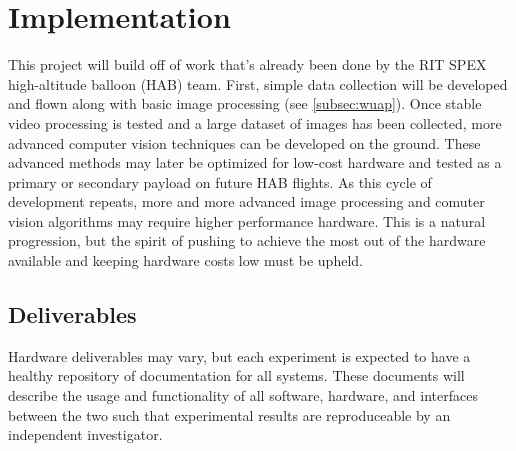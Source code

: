 \documentclass[conference]{IEEEtran} %
\begin{document}
\section{Implementation}
\label{sec:implementation}
This project will build off of work that's already been done by the RIT SPEX high-altitude balloon (HAB) team.
First, simple data collection will be developed and flown along with basic image processing (see \autoref{subsec:wuap}).
Once stable video processing is tested and a large dataset of images has been collected, more advanced computer vision techniques can be developed on the ground.
These advanced methods may later be optimized for low-cost hardware and tested as a primary or secondary payload on future HAB flights.
As this cycle of development repeats, more and more advanced image processing and comuter vision algorithms may require higher performance hardware.
This is a natural progression, but the spirit of pushing to achieve the most out of the hardware available and keeping hardware costs low must be upheld.


\subsection{Deliverables}
\label{subsec:deliverables}

Hardware deliverables may vary, but each experiment is expected to have a healthy repository of documentation for all systems.
These documents will describe the usage and functionality of all software, hardware, and interfaces between the two such that experimental results are reproduceable by an independent investigator.
\end{document}
